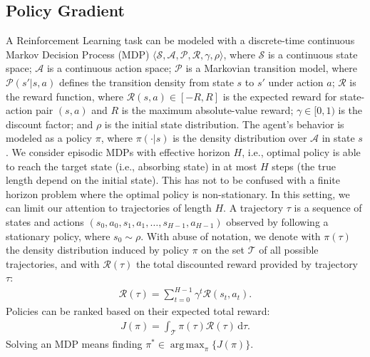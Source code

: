 \documentclass{article}
\makeatletter
\theoremstyle{remark}
\theoremstyle{definition}
\DeclareRobustCommand{\ie}{i.e.,\@\xspace}
\DeclareMathOperator*{\argmax}{arg\,max}
\newcommand{\de}{\,\mathrm{d}}
\newcommand{\Aspace}{\mathcal{A}}
\newcommand{\Sspace}{\mathcal{S}}
\newcommand{\Tspace}{\mathcal{T}}
\newcommand{\Transition}{\mathcal{P}}
\newcommand{\Reward}{\mathcal{R}}
\makeatother
\begin{document}
\subsection{Policy Gradient}\label{subsec:PolicyGradient}
A Reinforcement Learning task \cite{sutton2011reinforcement} can be modeled with a discrete-time continuous Markov Decision Process (MDP) $\langle\Sspace,\Aspace,\Transition,\Reward,\gamma,\rho\rangle$, where $\Sspace$ is a continuous state space; $\Aspace$ is a continuous action space; $\Transition$ is a Markovian transition model, where $\Transition(s'|s,a)$ defines the transition density from state $s$ to $s'$ under action $a$; $\Reward$ is the reward function, where $\Reward(s,a) \in [-R,R]$ is the expected reward for state-action pair $(s,a)$ and $R$ is the maximum absolute-value reward; $\gamma\in[0,1)$ is the discount factor; and $\rho$ is the initial state distribution.
The agent's behavior is modeled as a policy $\pi$, where $\pi(\cdot|s)$ is the density distribution over $\Aspace$ in state $s$.
We consider episodic MDPs with effective horizon $H$, \ie optimal policy is able to reach the target state (\ie absorbing state) in at most $H$ steps (the true length depend on the initial state). This has not to be confused with a finite horizon problem where the optimal policy is non-stationary. In this setting, we can limit our attention to trajectories of length $H$. A trajectory $\tau$ is a sequence of states and actions $(s_0,a_0,s_1,a_1,\dots,s_{H-1},a_{H-1})$ observed by following a stationary policy, where $s_0 \sim \rho$.
With abuse of notation, we denote with $\pi(\tau)$ the density distribution induced by policy $\pi$ on the set $\Tspace$ of all possible trajectories, and with $\Reward(\tau)$ the total discounted reward provided by trajectory $\tau$:
\begin{align*}
\Reward(\tau) = \sum_{t=0}^{H-1}\gamma^t\Reward(s_t,a_t).
\end{align*}
Policies can be ranked based on their expected total reward:
\begin{align*}
	J(\pi) = \int_{\Tspace}\pi(\tau)\Reward(\tau)\de \tau.
\end{align*}
Solving an MDP means finding $\pi^* \in \argmax_{\pi} \{J(\pi)\}$.
\end{document}

